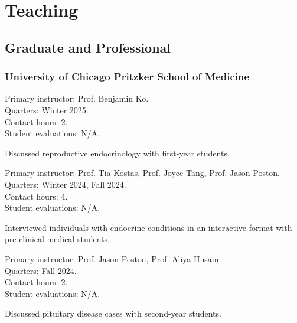 \documentclass[%
]{komacv}
\begin{document}
\section{Teaching}

\subsection{Graduate and Professional}

\subsubsection{University of Chicago Pritzker School of Medicine}

{Primary instructor: Prof. Benjamin Ko.\\
Quarters: Winter 2025.\\
Contact hours: 2.\\
Student evaluations: N/A.
\begin{compactitem}
\item Discussed reproductive endocrinology with first-year students.
\end{compactitem}}

{Primary instructor: Prof. Tia Kostas, Prof. Joyce Tang, Prof. Jason Poston.\\
Quarters: Winter 2024, Fall 2024.\\
Contact hours: 4.\\
Student evaluations: N/A.
\begin{compactitem}
\item Interviewed individuals with endocrine conditions in an interactive format with pre-clinical medical students.
\end{compactitem}}

{Primary instructor: Prof. Jason Poston, Prof. Aliya Husain.\\
Quarters: Fall 2024.\\
Contact hours: 2.\\
Student evaluations: N/A.
\begin{compactitem}
\item Discussed pituitary disease cases with second-year students.
\end{compactitem}}
\end{document}
